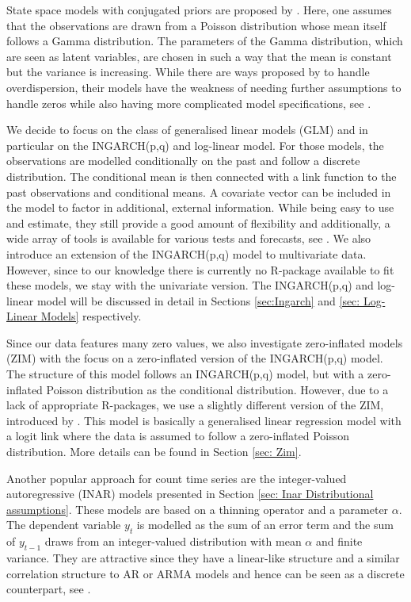 State space models with conjugated priors are proposed by \textcite{Harvey:1989}. Here, one assumes that the observations are drawn from a Poisson distribution whose mean itself follows a Gamma distribution. The parameters of the Gamma distribution, which are seen as latent variables, are chosen in such a way that the mean is constant but the variance is increasing. While there are ways proposed by \textcite{Qaqish:1988} to handle overdispersion, their models have the weakness of needing further assumptions to handle zeros while also having more complicated model specifications, see \textcite{Heinen:2003}.

We decide to focus on the class of generalised linear models (GLM) and in particular on the INGARCH(p,q) and log-linear model. For those models, the observations are modelled conditionally on the past and follow a discrete distribution. The conditional mean is then connected with a link function to the past observations and conditional means. A covariate vector can be included in the model to factor in additional, external information. While being easy to use and estimate, they still provide a good amount of flexibility and additionally, a wide array of tools is available for various tests and forecasts, see \textcite{Liboschik:2016}. We also introduce an extension of the INGARCH(p,q) model to multivariate data. However, since to our knowledge there is currently no R-package available to fit these models, we stay with the univariate version. The INGARCH(p,q) and log-linear model will be discussed in detail in Sections \ref{sec:Ingarch} and \ref{sec: Log-Linear Models} respectively.

Since our data features many zero values, we also investigate zero-inflated models (ZIM) with the focus on a zero-inflated version of the INGARCH(p,q) model. The structure of this model follows an INGARCH(p,q) model, but with a zero-inflated Poisson distribution as the conditional distribution. However, due to a lack of appropriate R-packages, we use a slightly different version of the ZIM, introduced by \textcite{Lambert:1992}. This model is basically a generalised linear regression model with a logit link where the data is assumed to follow a zero-inflated Poisson distribution. More details can be found in Section \ref{sec: Zim}.

Another popular approach for count time series are the integer-valued autoregressive (INAR) models presented in Section \ref{sec: Inar Distributional assumptions}. These models are based on a thinning operator and a parameter $\alpha$. The dependent variable $y_t$ is modelled as the sum of an error term and the sum of $y_{t-1}$ draws from an integer-valued distribution with mean $\alpha$ and finite variance. They are attractive since they have a linear-like structure and a similar correlation structure to AR or ARMA models and hence can be seen as a discrete counterpart, see \textcite{Heinen:2003}. 


